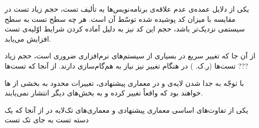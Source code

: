 
یکی از دلایل عمده‌ی عدم علاقه‌ی برنامه‌نویس‌ها به تألیف تست، حجم زیاد تست در مقایسه با میزان کد پوشیده شده توسّط آن است. هر چه سطح تست به سطح سیستمی نزدیک‌تر باشد، حجم این کد نیز به دلیل آماده کردن شرایط اوّلیه‌ی تست افزایش می‌یابد.

از آن جا که تغییر سریع در بسیاری از سیستم‌های نرم‌افزاری ضروری است، حجم زیاد تست‌ها (ر.ک. ) در هنگام تغییر نیز نیاز به هم‌گام‌سازی دارند. از آنجا که تست‌ها ???

با توجّه به جدا شدن لایه‌ی  و  در معماری پیشنهادی، تغییرات محدود به بخشی از ها خواهند بود که واقعاً تغییر کرده و به بخش‌های دیگر انتشار نمی‌یابند.


یکی از تفاوت‌های اساسی معماری پیشنهادی و معماری‌های تک‌لایه در 
از آنجا که یک  
دسته تست به جای تک تست

